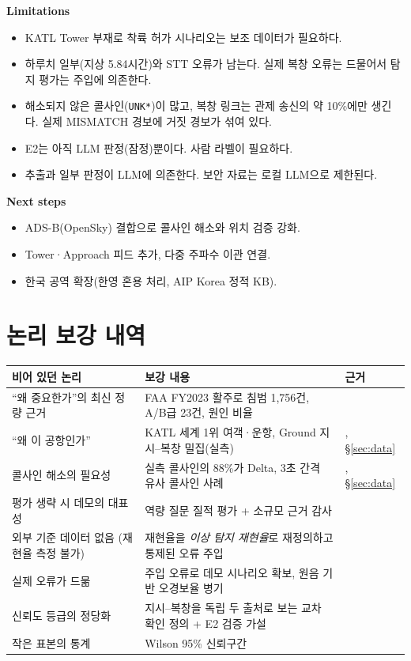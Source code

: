 \documentclass[10pt,a4paper]{article}
\begin{document}
\begin{minipage}[t]{0.49\textwidth}
\textbf{Limitations}
\begin{itemize}[leftmargin=12pt]
\item KATL Tower 부재로 착륙 허가 시나리오는 보조 데이터가 필요하다.
\item 하루치 일부(지상 5.84시간)와 STT 오류가 남는다. 실제 복창 오류는 드물어서 탐지 평가는 주입에 의존한다.
\item 해소되지 않은 콜사인(\texttt{UNK*})이 많고, 복창 링크는 관제 송신의 약 10\%에만 생긴다. 실제 MISMATCH 경보에 거짓 경보가 섞여 있다.
\item E2는 아직 LLM 판정(잠정)뿐이다. 사람 라벨이 필요하다.
\item 추출과 일부 판정이 LLM에 의존한다. 보안 자료는 로컬 LLM으로 제한된다.
\end{itemize}
\textbf{Next steps}
\begin{itemize}[leftmargin=12pt]
\item ADS-B(OpenSky) 결합으로 콜사인 해소와 위치 검증 강화.
\item Tower·Approach 피드 추가, 다중 주파수 이관 연결.
\item 한국 공역 확장(한영 혼용 처리, AIP Korea 정적 KB).
\end{itemize}
\end{minipage}

\appendix
\section{논리 보강 내역}
\begin{center}\small
\begin{tabularx}{\textwidth}{@{}>{\raggedright\arraybackslash}p{3.8cm}>{\raggedright\arraybackslash}X>{\raggedright\arraybackslash}p{3.2cm}@{}}
\toprule
비어 있던 논리 & 보강 내용 & 근거\\\midrule
``왜 중요한가''의 최신 정량 근거 & FAA FY2023 활주로 침범 1,756건, A/B급 23건, 원인 비율 & \cite{faaincursion}\\
``왜 이 공항인가'' & KATL 세계 1위 여객·운항, Ground 지시--복창 밀집(실측) & \cite{aci2024}, \S\ref{sec:data}\\
콜사인 해소의 필요성 & 실측 콜사인의 88\%가 Delta, 3초 간격 유사 콜사인 사례 & \cite{eurocontrol}, \S\ref{sec:data}\\
평가 생략 시 데모의 대표성 & 역량 질문 질적 평가 + 소규모 근거 감사 & \cite{gruninger1995,noy2001,zaveri2016}\\
외부 기준 데이터 없음 (재현율 측정 불가) & 재현율을 \emph{이상 탐지 재현율}로 재정의하고 통제된 오류 주입 & \cite{helmke2022,cardosi94}\\
실제 오류가 드묾 & 주입 오류로 데모 시나리오 확보, 원음 기반 오경보율 병기 & \cite{cardosi94}\\
신뢰도 등급의 정당화 & 지시--복창을 독립 두 출처로 보는 교차 확인 정의 + E2 검증 가설 & \cite{faa7110}\\
작은 표본의 통계 & Wilson 95\% 신뢰구간 & \cite{wilson1927}\\
\bottomrule
\end{tabularx}
\end{center}
\end{document}
